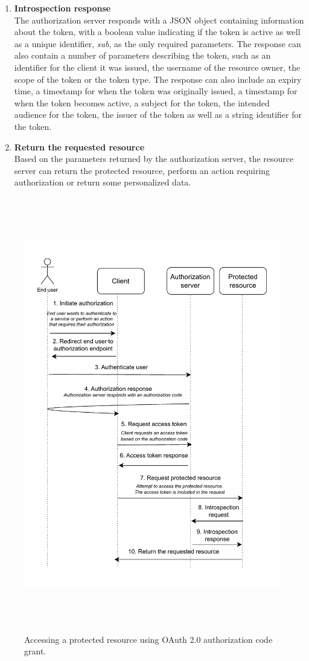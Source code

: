 \begin{enumerate}
    \item \textbf{Introspection response} \\
    The authorization server responds with a JSON object containing information about the token, with a boolean value indicating if the token is active as well as a unique identifier, \textit{sub}, as the only required parameters.
    The response can also contain a number of parameters describing the token, such as an identifier for the client it was issued, the username of the resource owner, the scope of the token or the token type.
    The response can also include an expiry time, a timestamp for when the token was originally issued, a timestamp for when the token becomes active, a subject for the token, the intended audience for the token, the issuer of the token as well as a string identifier for the token.
    \item \textbf{Return the requested resource} \\
    Based on the parameters returned by the authorization server, the resource server can return the protected resource, perform an action requiring authorization or return some personalized data.
\end{enumerate}

\begin{figure}
	\centering
	\includegraphics[height=190mm]{assets/oauth_authorization_code_grant.drawio.pdf}
	\caption{Accessing a protected resource using OAuth 2.0 authorization code grant.}
	\label{oauth_code_flow}
\end{figure}


